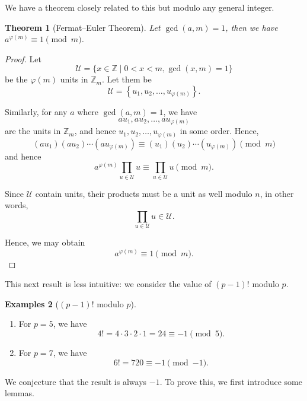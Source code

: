 \documentclass{article}
\newtheorem{theorem}{Theorem}[section]
\theoremstyle{definition}
\newtheorem{examples}[theorem]{Examples}
\theoremstyle{remark}
\newcommand{\pqty}[1]{\left(#1\right)}
\newcommand{\Bqty}[1]{\left\{#1\right\}}
\newcommand{\set}[2]{\{#1\mid #2\}}
\newcommand{\totient}{\varphi}
\newcommand{\ZZ}{\mathbb{Z}}
\begin{document}
We have a theorem closely related to this but modulo any general integer.

\begin{theorem}[Fermat--Euler Theorem]
    Let \(\gcd\pqty{a, m} = 1\), then we have \(a^{\totient\pqty{m}} \equiv 1 \pmod{m}\).
\end{theorem}

\begin{proof}
    Let
    \[
        \mathcal{U} = \set{x \in \ZZ}{0 < x < m, \gcd\pqty{x, m} = 1}
    \]
    be the \(\totient\pqty{m}\) units in \(\ZZ_{m}\). Let them be
    \[
        \mathcal{U} = \Bqty{u_1, u_2, \ldots, u_{\totient\pqty{m}}}.
    \]

    Similarly, for any \(a\) where \(\gcd\pqty{a, m} = 1\), we have
    \[
        a u_1, a u_2, \ldots, a u_{\totient\pqty{m}}
    \]
    are the units in \(\ZZ_m\), and hence \(u_1, u_2, \ldots, u_{\totient\pqty{m}}\) in some order. Hence,
    \[
        \pqty{a u_1} \pqty{a u_2} \cdots \pqty{a u_{\totient\pqty{m}}} \equiv \pqty{u_1} \pqty{u_2} \cdots \pqty{u_{\totient\pqty{m}}} \pmod{m}
    \]
    and hence
    \[
        a^{\totient \pqty{m}} \prod_{u \in \mathcal{U}} u \equiv \prod_{u \in \mathcal{U}} u \pmod{m}.
    \]

    Since \(\mathcal{U}\) contain units, their products must be a unit as well modulo \(n\), in other words,
    \[
        \prod_{u \in \mathcal{U}} u \in \mathcal{U}.
    \]

    Hence, we may obtain
    \[
        a^{\totient\pqty{m}} \equiv 1 \pmod{m}.
    \]
\end{proof}

This next result is less intuitive: we consider the value of \(\pqty{p - 1}!\) modulo \(p\).

\begin{examples}[\(\pqty{p - 1}!\) modulo \(p\)]
    \begin{enumerate}
        \item For \(p = 5\), we have
        \[
            4! = 4 \cdot 3 \cdot 2 \cdot 1 = 24 \equiv -1 \pmod{5}.
        \]

        \item For \(p = 7\), we have
        \[
            6! = 720 \equiv -1 \pmod{-1}.
        \]
    \end{enumerate}
\end{examples}

We conjecture that the result is always \(-1\). To prove this, we first introduce some lemmas.
\end{document}

